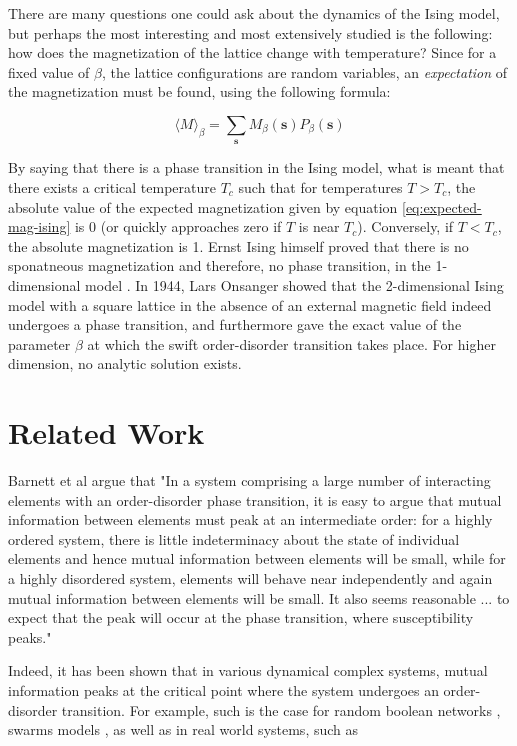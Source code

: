 \documentclass[12pt]{article}
\begin{document}
There are many questions one could ask about the dynamics of the Ising model, but perhaps the most interesting and most extensively studied is the following: how does the magnetization of the lattice change with temperature? Since for a fixed value of $\beta$, the lattice configurations are random variables, an \textit{expectation} of the magnetization must be found, using the following formula:

\begin{equation}
\langle M \rangle_\beta = \sum_{\boldsymbol{s}} M_\beta(\boldsymbol{s}) P_\beta(\boldsymbol{s})
\label{eq:expected-mag-ising}
\end{equation}

By saying that there is a phase transition in the Ising model, what is meant that there exists a critical temperature $T_c$ such that for temperatures $T > T_c$, the absolute value of the expected magnetization given by equation \ref{eq:expected-mag-ising} is 0 (or quickly approaches zero if $T$ is near $T_c$). Conversely, if $T < T_c$, the absolute magnetization is 1. Ernst Ising himself proved that there is no sponatneous magnetization and therefore, no phase transition, in the 1-dimensional model \cite{Ising1925}. In 1944, Lars Onsanger showed \cite{lars-onsanger} that the 2-dimensional Ising model with a square lattice in the absence of an external magnetic field indeed undergoes a phase transition, and furthermore gave the exact value of the parameter $\beta$ at which the swift order-disorder transition takes place. For higher dimension, no analytic solution exists. 

\newpage
\section{Related Work} 

Barnett et al \cite{barnett-ising} argue that "In a system comprising a large number of interacting elements with an order-disorder phase transition, it is easy to argue that mutual information between elements must peak at an intermediate order: for a highly ordered system, there is little indeterminacy about the state of individual elements and hence mutual information between elements will be small, while for a highly disordered system, elements will behave near independently and again mutual information between elements will be small. It also seems reasonable ... to expect that the peak will occur at the phase transition, where susceptibility peaks."

Indeed, it has been shown that in various dynamical complex systems, mutual information peaks at the critical point where the system undergoes an order-disorder transition. For example, such is the case for random boolean networks \cite{lizier-rand-bool-nets}, swarms models \cite{mi-swarms}, as well as in real world systems, such as \cite{mi-financial-markets}
\end{document}
